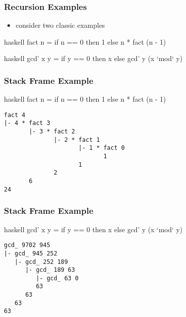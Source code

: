 \documentclass[dvipsnames]{beamer}
\theoremstyle{plain}
\begin{document}
\begin{frame}[fragile]
  \frametitle{Recursion Examples}

  \begin{itemize}
    \item consider two classic examples
  \end{itemize}

  \begin{example}[factorial]
    \begin{pygments}{haskell}
fact n =
    if n == 0
    then 1
    else n * fact (n - 1)
    \end{pygments}
  \end{example}

  \begin{example}
    \begin{pygments}{haskell}
gcd' x y =
    if y == 0
    then x
    else gcd' y (x `mod` y)
    \end{pygments}
  \end{example}
\end{frame}

\begin{frame}[fragile]
  \frametitle{Stack Frame Example}

  \begin{example}[fact]
    \begin{pygments}{haskell}
fact n =
    if n == 0 then 1
    else n * fact (n - 1)
    \end{pygments}

    \pause
    \begin{verbatim}
fact 4
|- 4 * fact 3
       |- 3 * fact 2
              |- 2 * fact 1
                     |- 1 * fact 0
                            1
                     1
              2
       6
24
    \end{verbatim}
  \end{example}
\end{frame}

\begin{frame}[fragile]
  \frametitle{Stack Frame Example}

  \begin{example}[gcd']
    \begin{pygments}{haskell}
gcd' x y =
    if y == 0 then x
    else gcd' y (x `mod` y)
    \end{pygments}

    \pause
    \begin{verbatim}
gcd_ 9702 945
|- gcd_ 945 252
   |- gcd_ 252 189
      |- gcd_ 189 63
         |- gcd_ 63 0
         63
      63
   63
63
    \end{verbatim}
  \end{example}
\end{frame}
\end{document}
